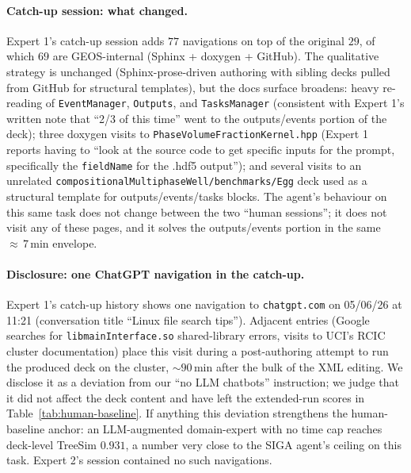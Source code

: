 \documentclass{article}
\begin{document}
\paragraph{Catch-up session: what changed.} Expert 1's catch-up session adds $77$ navigations on top of the original $29$, of which $69$ are GEOS-internal (Sphinx + doxygen + GitHub). The qualitative strategy is unchanged (Sphinx-prose-driven authoring with sibling decks pulled from GitHub for structural templates), but the docs surface broadens: heavy re-reading of \texttt{EventManager}, \texttt{Outputs}, and \texttt{TasksManager} (consistent with Expert 1's written note that ``2/3 of this time'' went to the outputs/events portion of the deck); three doxygen visits to \texttt{PhaseVolumeFractionKernel.hpp} (Expert 1 reports having to ``look at the source code to get specific inputs for the prompt, specifically the \texttt{fieldName} for the .hdf5 output''); and several visits to an unrelated \texttt{compositionalMultiphaseWell/benchmarks/Egg} deck used as a structural template for outputs/events/tasks blocks. The agent's behaviour on this same task does not change between the two ``human sessions''; it does not visit any of these pages, and it solves the outputs/events portion in the same ${\approx}\,7\,$min envelope.

\paragraph{Disclosure: one ChatGPT navigation in the catch-up.} Expert 1's catch-up history shows one navigation to \texttt{chatgpt.com} on 05/06/26 at 11:21 (conversation title ``Linux file search tips''). Adjacent entries (Google searches for \texttt{libmainInterface.so} shared-library errors, visits to UCI's RCIC cluster documentation) place this visit during a post-authoring attempt to run the produced deck on the cluster, ${\sim}90\,$min after the bulk of the XML editing. We disclose it as a deviation from our ``no LLM chatbots'' instruction; we judge that it did not affect the deck content and have left the extended-run scores in Table~\ref{tab:human-baseline}. If anything this deviation strengthens the human-baseline anchor: an LLM-augmented domain-expert with no time cap reaches deck-level TreeSim $0.931$, a number very close to the SIGA agent's ceiling on this task. Expert 2's session contained no such navigations.
\end{document}
